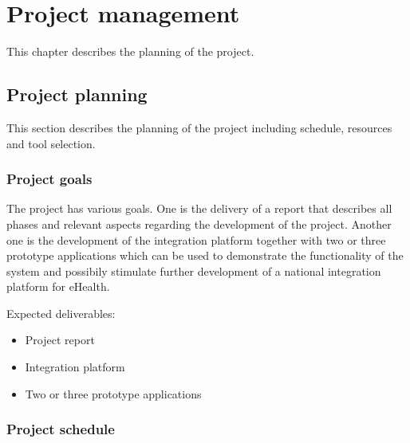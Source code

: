 \chapter{Project management}

\label{ch:management}


\nocite{Sommerville9}


This chapter describes the planning of the project.

\section{Project planning}
\label{section:planning}
This section describes the planning of the project including schedule, resources and tool selection.

\subsection{Project goals}
The project has various goals. One is the delivery of a report that describes all phases and relevant aspects regarding the development of the project. Another one is the development of the integration platform together with two or three prototype applications which can be used to demonstrate the functionality of the system and possibily stimulate further development of a national integration platform for eHealth.

Expected deliverables:

\begin{itemize}
\item Project report
\item Integration platform
\item Two or three prototype applications
\end{itemize}


\subsection{Project schedule}
\label{section:schedule}

